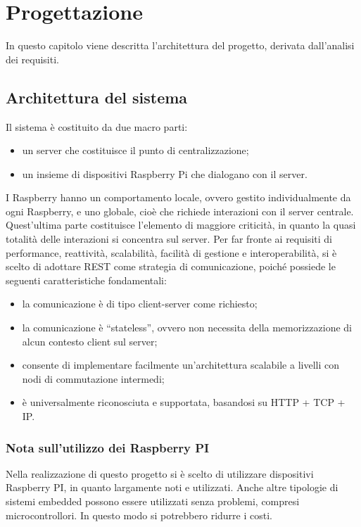 \chapter{Progettazione}

In questo capitolo viene descritta l'architettura del progetto, derivata dall'analisi dei requisiti.

\section{Architettura del sistema}
Il sistema è costituito da due macro parti:
\begin{itemize}
 \item un server che costituisce il punto di centralizzazione;
 \item un insieme di dispositivi Raspberry Pi che dialogano con il server.
\end{itemize}
I Raspberry hanno un comportamento locale, ovvero gestito individualmente da ogni Raspberry, e uno globale, cioè che richiede interazioni con il server centrale. Quest'ultima parte costituisce l'elemento di maggiore criticità, in quanto la quasi totalità delle interazioni si concentra sul server. Per far fronte ai requisiti di performance, reattività, scalabilità, facilità di gestione e interoperabilità, si è scelto di adottare REST come strategia di comunicazione, poiché possiede le seguenti caratteristiche fondamentali:
\begin{itemize}
 \item la comunicazione è di tipo client-server come richiesto;
 \item la comunicazione è ``stateless'', ovvero non necessita della memorizzazione di alcun contesto client sul server;
 \item consente di implementare facilmente un'architettura scalabile a livelli con nodi di commutazione intermedi;
 \item è universalmente riconosciuta e supportata, basandosi su HTTP + TCP + IP.
\end{itemize}
\subsection{Nota sull'utilizzo dei Raspberry PI}
Nella realizzazione di questo progetto si è scelto di utilizzare dispositivi Raspberry PI, in quanto largamente noti e utilizzati. Anche altre tipologie di sistemi embedded possono essere utilizzati senza problemi, compresi microcontrollori. In questo modo si potrebbero ridurre i costi.


